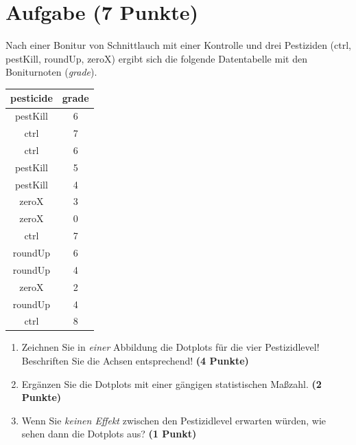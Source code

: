\documentclass[a4paper, 10pt]{scrartcl}\usepackage[]{graphicx}\usepackage[]{xcolor}
\begin{document}
\vspace{1cm}
 




 
\clearpage

\section{Aufgabe \hfill (7 Punkte)}

Nach einer Bonitur von Schnittlauch mit einer Kontrolle und drei Pestiziden (ctrl, pestKill, roundUp, zeroX) ergibt sich die folgende Datentabelle mit den Boniturnoten (\textit{grade}). 

\begin{table}[!h]
\centering
\begin{tabular}{cc}
\toprule
pesticide & grade\\
\midrule
pestKill & 6\\
ctrl & 7\\
ctrl & 6\\
pestKill & 5\\
pestKill & 4\\
\addlinespace
zeroX & 3\\
zeroX & 0\\
ctrl & 7\\
roundUp & 6\\
roundUp & 4\\
\addlinespace
zeroX & 2\\
roundUp & 4\\
ctrl & 8\\
\bottomrule
\end{tabular}
\end{table}



\begin{enumerate}
\item Zeichnen Sie in \textit{einer} Abbildung die Dotplots f{\"u}r die
  vier Pestizidlevel! Beschriften Sie die Achsen entsprechend!
  \textbf{(4 Punkte)}
\item Erg{\"a}nzen Sie die Dotplots mit einer g{\"a}ngigen
  statistischen Ma{\ss}zahl. \textbf{(2 Punkte)}
\item Wenn Sie \textit{keinen Effekt} zwischen den Pestizidlevel erwarten
  w{\"u}rden, wie sehen dann die Dotplots aus? \textbf{(1 Punkt)}
\end{enumerate} 
\clearpage
\end{document}
